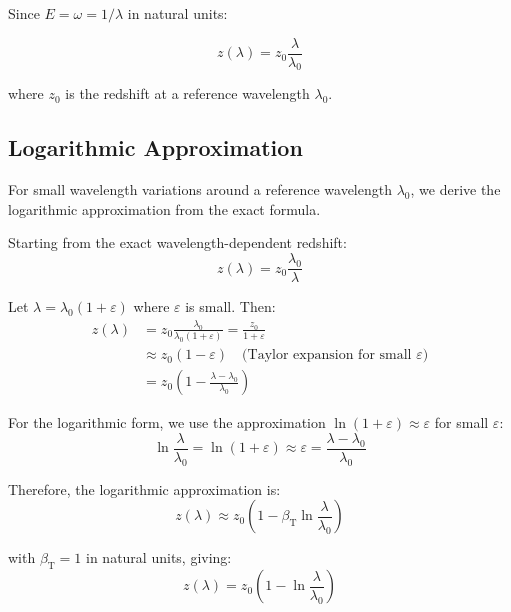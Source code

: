 \documentclass[12pt,a4paper]{article}
\newcommand{\betaT}{\beta_{\text{T}}}
\begin{document}
	Since $E = \omega = 1/\lambda$ in natural units:
	
	\begin{equation}
		\label{eq:wavelength_dependence}
		z(\lambda) = z_0 \frac{\lambda}{\lambda_0}
	\end{equation}
	
	where $z_0$ is the redshift at a reference wavelength $\lambda_0$.
	
\subsection{Logarithmic Approximation}
\label{subsec:logarithmic_approximation}

For small wavelength variations around a reference wavelength $\lambda_0$, we derive the logarithmic approximation from the exact formula.

Starting from the exact wavelength-dependent redshift:
\begin{equation}
	z(\lambda) = z_0 \frac{\lambda_0}{\lambda}
\end{equation}

Let $\lambda = \lambda_0(1 + \varepsilon)$ where $\varepsilon$ is small. Then:
\begin{align}
	z(\lambda) &= z_0 \frac{\lambda_0}{\lambda_0(1+\varepsilon)} = \frac{z_0}{1+\varepsilon} \\
	&\approx z_0(1-\varepsilon) \quad \text{(Taylor expansion for small $\varepsilon$)} \\
	&= z_0\left(1 - \frac{\lambda-\lambda_0}{\lambda_0}\right)
\end{align}

For the logarithmic form, we use the approximation $\ln(1+\varepsilon) \approx \varepsilon$ for small $\varepsilon$:
\begin{equation}
	\ln\frac{\lambda}{\lambda_0} = \ln(1+\varepsilon) \approx \varepsilon = \frac{\lambda-\lambda_0}{\lambda_0}
\end{equation}

Therefore, the logarithmic approximation is:
\begin{equation}
	\boxed{z(\lambda) \approx z_0\left(1 - \betaT \ln\frac{\lambda}{\lambda_0}\right)}
	\label{eq:corrected_logarithmic_redshift}
\end{equation}

with $\betaT = 1$ in natural units, giving:
\begin{equation}
	\boxed{z(\lambda) = z_0\left(1 - \ln\frac{\lambda}{\lambda_0}\right)}
\end{equation}
\end{document}
